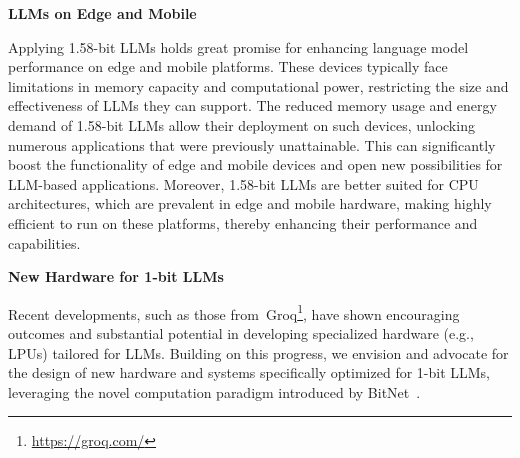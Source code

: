 \textbf{LLMs on Edge and Mobile}

Applying 1.58-bit LLMs holds great promise for enhancing language model performance on edge and mobile platforms. These devices typically face limitations in memory capacity and computational power, restricting the size and effectiveness of LLMs they can support. The reduced memory usage and energy demand of 1.58-bit LLMs allow their deployment on such devices, unlocking numerous applications that were previously unattainable. This can significantly boost the functionality of edge and mobile devices and open new possibilities for LLM-based applications. Moreover, 1.58-bit LLMs are better suited for CPU architectures, which are prevalent in edge and mobile hardware, making  highly efficient to run on these platforms, thereby enhancing their performance and capabilities.

\textbf{New Hardware for 1-bit LLMs}

Recent developments, such as those from~Groq\footnote{\url{https://groq.com/}}, have shown encouraging outcomes and substantial potential in developing specialized hardware (e.g., LPUs) tailored for LLMs. Building on this progress, we envision and advocate for the design of new hardware and systems specifically optimized for 1-bit LLMs, leveraging the novel computation paradigm introduced by BitNet~\cite{bitnet}. 

